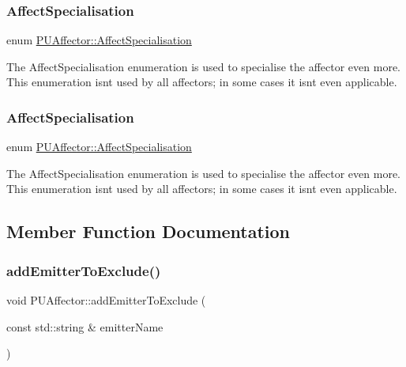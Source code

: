 \subsubsection{\texorpdfstring{Affect\+Specialisation}{AffectSpecialisation}\hspace{0.1cm}{\footnotesize\ttfamily [1/2]}}
{\footnotesize\ttfamily enum \hyperlink{classPUAffector_aa4e8045ac29ee020895fd3e386935013}{P\+U\+Affector\+::\+Affect\+Specialisation}}

The Affect\+Specialisation enumeration is used to specialise the affector even more. This enumeration isn\textquotesingle{}t used by all affectors; in some cases it isn\textquotesingle{}t even applicable. \mbox{\label{classPUAffector_aa4e8045ac29ee020895fd3e386935013}} 
\subsubsection{\texorpdfstring{Affect\+Specialisation}{AffectSpecialisation}\hspace{0.1cm}{\footnotesize\ttfamily [2/2]}}
{\footnotesize\ttfamily enum \hyperlink{classPUAffector_aa4e8045ac29ee020895fd3e386935013}{P\+U\+Affector\+::\+Affect\+Specialisation}}

The Affect\+Specialisation enumeration is used to specialise the affector even more. This enumeration isn\textquotesingle{}t used by all affectors; in some cases it isn\textquotesingle{}t even applicable. 

\subsection{Member Function Documentation}
\mbox{\label{classPUAffector_aaf379b616eb066ce9535a56c1c4bd4cd}} 
\subsubsection{\texorpdfstring{add\+Emitter\+To\+Exclude()}{addEmitterToExclude()}\hspace{0.1cm}{\footnotesize\ttfamily [1/2]}}
{\footnotesize\ttfamily void P\+U\+Affector\+::add\+Emitter\+To\+Exclude (\begin{DoxyParamCaption}\item[{const std\+::string \&}]{emitter\+Name }\end{DoxyParamCaption})}

